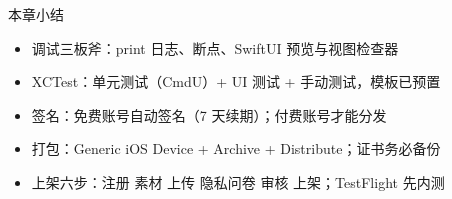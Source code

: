 \begin{tcbsummary}{本章小结}
\begin{itemize}
  \item 调试三板斧：print 日志、断点、SwiftUI 预览与视图检查器
  \item XCTest：单元测试（CmdU）+ UI 测试 + 手动测试，模板已预置
  \item 签名：免费账号自动签名（7 天续期）；付费账号才能分发
  \item 打包：Generic iOS Device + Archive + Distribute；证书务必备份
  \item 上架六步：注册 素材 上传 隐私问卷 审核 上架；TestFlight 先内测
\end{itemize}

\end{tcbsummary}
